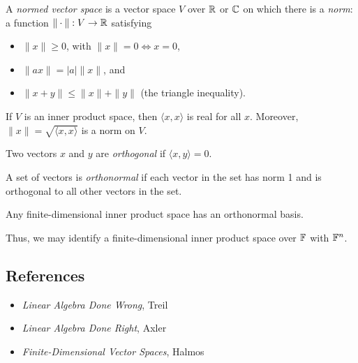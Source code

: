 \begin{defn}
  A \emph{normed vector space} is a vector space $V$ over $\mathbb{R}$ or $\mathbb{C}$
  on which there is a \emph{norm}: a function $\|\cdot\|:V\to\mathbb{R}$ satisfying
  \begin{itemize}
    \item $\| x\|\ge 0$, with $\|x\|=0\iff x=0$,
    \item $\|a x\|=|a|\| x\|$, and
    \item $\| x+ y\|\le\| x\|+\| y\|$ (the triangle
      inequality).
  \end{itemize}
\end{defn}
\begin{prop}
  If $V$ is an inner product space, then $\langle x, x\rangle$ is
  real for all $ x$.
  Moreover, $\| x\|=\sqrt{\langle x, x\rangle}$ is a norm
  on $V$.
\end{prop}
\begin{defn}
  Two vectors $ x$ and $ y$ are \emph{orthogonal} if $\langle
   x, y\rangle=0$.

  A set of vectors is \emph{orthonormal} if each vector in the set has norm 1
  and is orthogonal to all other vectors in the set.
\end{defn}
\begin{prop}
  Any finite-dimensional inner product space has an orthonormal basis.
\end{prop}
\begin{rem}
  Thus, we may identify a finite-dimensional inner product space over $\mathbb{F}$ with
  $\mathbb{F}^n$.
\end{rem}
\subsection*{References}
\begin{itemize}
  \item \emph{Linear Algebra Done Wrong}, Treil
  \item \emph{Linear Algebra Done Right}, Axler
  \item \emph{Finite-Dimensional Vector Spaces}, Halmos
\end{itemize}
